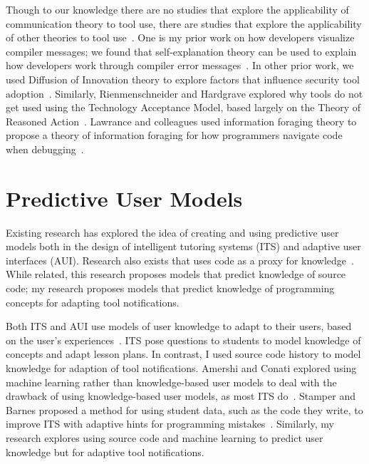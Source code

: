 Though to our knowledge there are no studies that explore the applicability of communication theory to tool use, there are studies that explore the applicability of other theories to tool use~\cite{barik14,xiao2014social,riemenschneider2001explaining}.  
One is my prior work on how developers visualize compiler messages; we found that self-explanation theory can be used to explain how developers work through compiler error messages~\cite{barik14}. 
In other prior work, we used Diffusion of Innovation theory to explore factors that influence 
security tool adoption~\cite{xiao2014social}. 
Similarly, Rienmenschneider and Hardgrave explored why tools do not get used using the Technology Acceptance Model, based largely on the Theory of Reasoned Action~\cite{riemenschneider2001explaining}.
Lawrance and colleagues used information foraging theory to propose a theory of information foraging for how programmers navigate code when debugging~\cite{lawrance2013programmers}. 

\section{Predictive User Models}
Existing research has explored the idea of creating and using predictive user models both in the design of intelligent tutoring systems (ITS) and adaptive user interfaces (AUI). Research also exists that uses code as a proxy for knowledge~\cite{fritz2010degree}. While related, this research proposes models that predict knowledge of source code; my research proposes models that predict knowledge of programming concepts for adapting tool notifications.

Both ITS and AUI use models of user knowledge to adapt to their users, based on the user's experiences~\cite{murray1999authoring}.
ITS pose questions to students to model knowledge of concepts and adapt lesson plans. In contrast, I used source code history to model knowledge for adaption of tool notifications.
Amershi and Conati explored using machine learning rather than knowledge-based user models to deal with the drawback of using knowledge-based user models, as most ITS do~\cite{amershi2007unsupervised}. 
Stamper and Barnes proposed a method for using student data, such as the code they write, to improve ITS with adaptive hints for programming mistakes~\cite{stamper2009unsupervised}.
Similarly, my research explores using source code and machine learning to predict user knowledge but for adaptive tool notifications.

